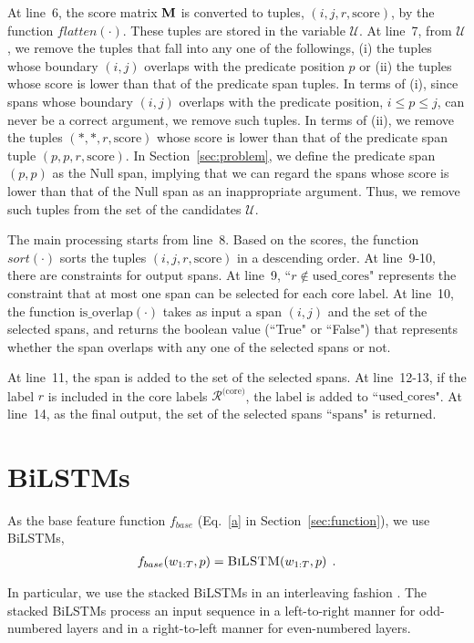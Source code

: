 \documentclass[11pt,a4paper]{article}
\begin{document}
At line~6, the score matrix ${\bf M}$ is converted to tuples, $(i, j, r, \text{score})$, by the function $flatten(\cdot)$.
These tuples are stored in the variable $\mathcal{U}$.
At line~7, from $\mathcal{U}$, we remove the tuples that fall into any one of the followings, (i) the tuples whose boundary $(i, j)$ overlaps with the predicate position $p$ or (ii) the tuples whose score is lower than that of the predicate span tuples.
In terms of (i), since spans whose boundary $(i, j)$ overlaps with the predicate position, $i \leq p \leq j$, can never be a correct argument, we remove such tuples.
In terms of (ii), we remove the tuples $(*, *, r, \text{score})$ whose score is lower than that of the predicate span tuple $(p, p, r, \text{score})$.
In Section\ \ref{sec:problem}, we define the predicate span $(p, p)$ as the {\sc Null} span, implying that we can regard the spans whose score is lower than that of the {\sc Null} span as an inappropriate argument.
Thus, we remove such tuples from the set of the candidates $\mathcal{U}$.

The main processing starts from line~8.
Based on the scores, the function $sort(\cdot)$ sorts the tuples $(i, j, r, \text{score})$ in a descending order.
At line~9-10, there are constraints for output spans.
At line~9, ``$r \notin \text{used\_cores}$" represents the constraint that at most one span can be selected for each core label.
At line~10, the function $\text{is\_overlap}(\cdot)$ takes as input a span $(i, j)$ and the set of the selected spans, and returns the boolean value (``True" or ``False") that represents whether the span overlaps with any one of the selected spans or not.

At line~11, the span is added to the set of the selected spans.
At line~12-13, if the label $r$ is included in the core labels $\mathcal{R}^\text{(core)}$, the label is added to ``$\text{used\_cores}$".
At line~14, as the final output, the set of the selected spans ``$\text{spans}$" is returned.

\section{BiLSTMs}
\label{sec:lstm}

As the base feature function $f_{base}$ (Eq.~\ref{a} in Section~\ref{sec:function}), we use BiLSTMs,
\begin{align*}
f_{base}(w_{1:T}, p) = \textsc{BiLSTM}(w_{1:T}, p) \:\: .
\end{align*}

\noindent
In particular, we use the stacked BiLSTMs in an interleaving fashion \cite{zhou:15,he:17}.
The stacked BiLSTMs process an input sequence in a left-to-right manner for odd-numbered layers and in a right-to-left manner for even-numbered layers.
\end{document}
